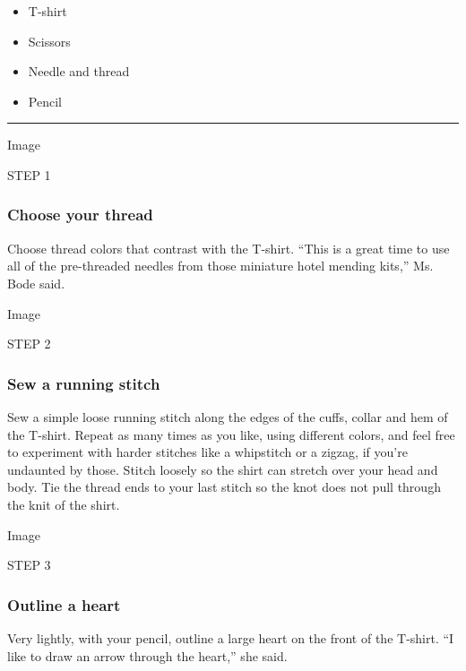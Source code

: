 \begin{itemize}
\item
  T-shirt
\item
  Scissors
\item
  Needle and thread
\item
  Pencil
\end{itemize}

\begin{center}\rule{0.5\linewidth}{\linethickness}\end{center}

Image

STEP 1

\hypertarget{choose-your-thread}{%
\subsubsection{\texorpdfstring{\textbf{Choose your
thread}}{Choose your thread}}\label{choose-your-thread}}

Choose thread colors that contrast with the T-shirt. ``This is a great
time to use all of the pre-threaded needles from those miniature hotel
mending kits,'' Ms. Bode said.

Image

STEP 2

\hypertarget{sew-a-running-stitch}{%
\subsubsection{\texorpdfstring{\textbf{Sew a running
stitch}}{Sew a running stitch}}\label{sew-a-running-stitch}}

Sew a simple loose running stitch along the edges of the cuffs, collar
and hem of the T-shirt. Repeat as many times as you like, using
different colors, and feel free to experiment with harder stitches like
a whipstitch or a zigzag, if you're undaunted by those. Stitch loosely
so the shirt can stretch over your head and body. Tie the thread ends to
your last stitch so the knot does not pull through the knit of the
shirt.

Image

STEP 3

\hypertarget{outline-a-heart}{%
\subsubsection{\texorpdfstring{\textbf{Outline a
heart}}{Outline a heart}}\label{outline-a-heart}}

Very lightly, with your pencil, outline a large heart on the front of
the T-shirt. ``I like to draw an arrow through the heart,'' she said.

